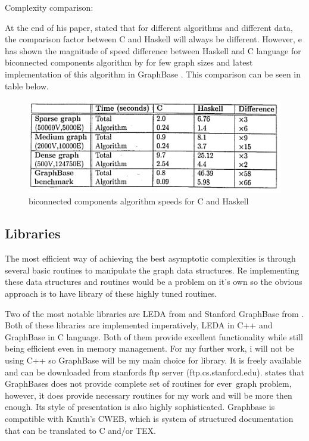 Complexity comparison:

At the end of his paper, \textcite{king1996functional} stated that for different algorithms and different data, the comparison factor between C and Haskell will always be different. However, e has shown the magnitude of speed difference between Haskell and C language for biconnected components algorithm by \textcite{tarjan1973efficient} for few graph sizes and latest implementation of this algorithm in GraphBase \parencite{knuth1993stanford}. This comparison can be seen in table below.

\begin{figure}[H]
    \includegraphics[width=\textwidth]{images/haskelVsC.png}
    \caption{biconnected components algorithm speeds for C and Haskell \parencite{king1996functional}}
\end{figure}

\subsection{Libraries}

The most efficient way of achieving the best asymptotic complexities is through several basic routines to manipulate the graph data structures. Re implementing these data structures and routines would be a problem on it's own so the obvious approach is to have library of these highly tuned routines. 

Two of the most notable libraries are LEDA from \textcite{mehlhorn1989leda} and Stanford GraphBase from  \textcite{knuth1993stanford}. Both of these libraries are implemented imperatively, LEDA in C++ and GraphBase in C language. Both of them provide excellent functionality while still being efficient even in memory management. For my further work, i will not be using C++ so GraphBase will be my main choice for library. It is freely available and can be downloaded from stanfords ftp server (ftp.cs.stanford.edu). \textcite{king1996functional} states that GraphBases does not provide complete set of routines for ever\ graph problem, however, it does provide necessary routines for my work and will be more then enough. Its style of presentation is also highly sophisticated. Graphbase is compatible with Knuth's CWEB, which is system of structured documentation that can be translated to C and/or TEX.


